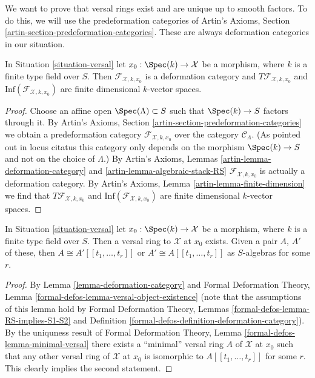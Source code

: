 \noindent
We want to prove that versal rings exist and are unique up to
smooth factors. To do this, we will use the predeformation categories of
Artin's Axioms, Section \ref{artin-section-predeformation-categories}.
These are always deformation categories in our situation.

\begin{lemma}
\label{lemma-deformation-category}
In Situation \ref{situation-versal} let $x_0 : \Spec(k) \to \mathcal{X}$
be a morphism, where $k$ is a finite type field over $S$.
Then $\mathcal{F}_{\mathcal{X}, k, x_0}$
is a deformation category and $T\mathcal{F}_{\mathcal{X}, k, x_0}$
and $\text{Inf}(\mathcal{F}_{\mathcal{X}, k, x_0})$
are finite dimensional $k$-vector spaces.
\end{lemma}

\begin{proof}
Choose an affine open $\Spec(\Lambda) \subset S$ such that
$\Spec(k) \to S$ factors through it.
By Artin's Axioms, Section \ref{artin-section-predeformation-categories}
we obtain a predeformation category
$\mathcal{F}_{\mathcal{X}, k, x_0}$
over the category $\mathcal{C}_\Lambda$.
(As pointed out in locus citatus this category only depends
on the morphism $\Spec(k) \to S$ and not on the choice of
$\Lambda$.) By Artin's Axioms, Lemmas
\ref{artin-lemma-deformation-category} and
\ref{artin-lemma-algebraic-stack-RS}
$\mathcal{F}_{\mathcal{X}, k, x_0}$ is actually a deformation category.
By Artin's Axioms, Lemma \ref{artin-lemma-finite-dimension}
we find that $T\mathcal{F}_{\mathcal{X}, k, x_0}$
and $\text{Inf}(\mathcal{F}_{\mathcal{X}, k, x_0})$
are finite dimensional $k$-vector spaces.
\end{proof}

\begin{lemma}
\label{lemma-versal-ring}
In Situation \ref{situation-versal} let $x_0 : \Spec(k) \to \mathcal{X}$
be a morphism, where $k$ is a finite type field over $S$.
Then a versal ring to $\mathcal{X}$ at $x_0$ exists. Given a pair
$A$, $A'$ of these, then $A \cong A'[[t_1, \ldots, t_r]]$
or $A' \cong A[[t_1, \ldots, t_r]]$ as $S$-algebras
for some $r$.
\end{lemma}

\begin{proof}
By Lemma \ref{lemma-deformation-category} and
Formal Deformation Theory, Lemma
\ref{formal-defos-lemma-versal-object-existence}
(note that the assumptions of this lemma hold by
Formal Deformation Theory, Lemmas
\ref{formal-defos-lemma-RS-implies-S1-S2} and
Definition \ref{formal-defos-definition-deformation-category}).
By the uniquness result of
Formal Deformation Theory, Lemma \ref{formal-defos-lemma-minimal-versal}
there exists a ``minimal'' versal ring $A$ of $\mathcal{X}$ at $x_0$
such that any other versal ring of $\mathcal{X}$ at $x_0$ is
isomorphic to $A[[t_1, \ldots, t_r]]$ for some $r$.
This clearly implies the second statement.
\end{proof}

